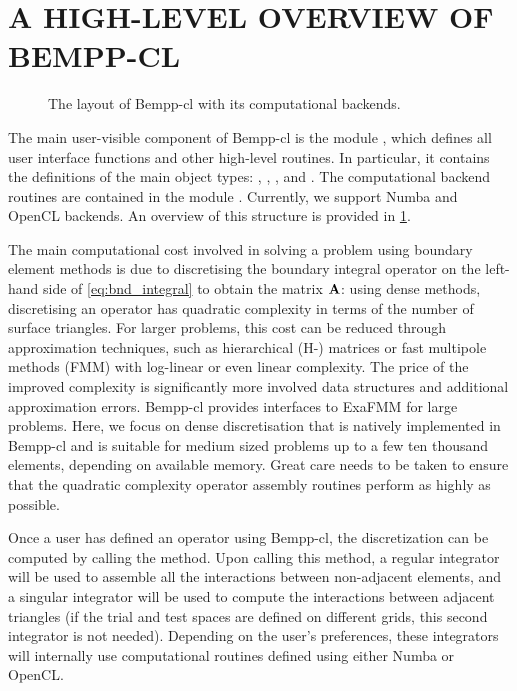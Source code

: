 \section{A HIGH-LEVEL OVERVIEW OF BEMPP-CL}

\begin{figure}
  \centering
  
  \caption{The layout of Bempp-cl with its computational backends.}
  \label{fig:overview}
\end{figure}

The main user-visible component of Bempp-cl is the module , which defines all user interface functions and other high-level routines. In particular, it contains the definitions of the main object types: \mbox{,} \mbox{,} \mbox{,} and . The computational backend routines are contained in the module . Currently, we support Numba and OpenCL backends. An overview of this structure is provided in \cref{fig:overview}.

The main computational cost involved in solving a problem using boundary element methods is due to discretising the boundary integral operator on the left-hand side of \cref{eq:bnd_integral} to obtain the matrix $\mathbf{A}$: using dense methods, discretising an operator has quadratic complexity in terms of the number of surface triangles. For larger problems, this cost can be reduced through approximation techniques, such as hierarchical (H-) matrices or fast multipole methods (FMM) with log-linear or even linear complexity. The price of the improved complexity is significantly more involved data structures and additional approximation errors. Bempp-cl provides interfaces to ExaFMM \cite{bempp_exafmm} for large problems. Here, we focus on dense discretisation that is natively implemented in Bempp-cl and is suitable for medium sized problems up to a few ten thousand elements, depending on available memory. Great care needs to be taken to ensure that the quadratic complexity operator assembly routines perform as highly as possible.

Once a user has defined an operator using Bempp-cl, the discretization can be computed by calling the  method. Upon calling this method, a regular integrator will be used to assemble all the interactions between non-adjacent elements, and a singular integrator will be used to compute the interactions between adjacent triangles (if the trial and test spaces are defined on different grids, this second integrator is not needed). Depending on the user's preferences, these integrators will internally use computational routines defined using either Numba or OpenCL.

